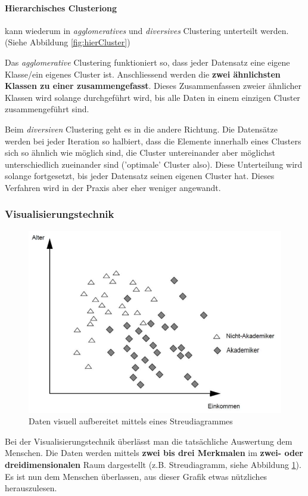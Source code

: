 \documentclass[a4paper, 11pt, nofootinbib]{article}
\begin{document}
 \paragraph{Hierarchisches Clusteriong} kann wiederum in \textit{agglomeratives} und \textit{diversives} Clustering unterteilt werden. (Siehe Abbildung \ref{fig:hierCluster})
 
 Das \textit{agglomerative} Clustering funktioniert so, dass jeder Datensatz eine eigene Klasse/ein eigenes Cluster ist. Anschliessend werden die \textbf{zwei ähnlichsten Klassen zu einer zusammengefasst}. Dieses Zusammenfassen zweier ähnlicher Klassen wird solange durchgeführt wird, bis alle Daten in einem einzigen Cluster zusammengeführt sind.
 
 \vspace{10px}
 
 \noindent Beim \textit{diversiven} Clustering geht es in die andere Richtung. Die Datensätze werden bei jeder Iteration so halbiert, dass die Elemente innerhalb eines Clusters sich so ähnlich wie möglich sind, die Cluster untereinander aber möglichst unterschiedlich zueinander sind ('optimale' Cluster also). Diese Unterteilung wird solange fortgesetzt, bis jeder Datensatz seinen eigenen Cluster hat. Dieses Verfahren wird in der Praxis aber eher weniger angewandt.
 
 \subsubsection{Visualisierungstechnik}
 \begin{figure}
 	\centering
 	\includegraphics[keepaspectratio=true,height=13\baselineskip]{streudiagramm.PNG}
 	\caption{Daten visuell aufbereitet mittels eines Streudiagrammes}
 	\label{fig:streu}
 \end{figure}
 Bei der Visualisierungstechnik überlässt man die tatsächliche Auswertung dem Menschen. Die Daten werden mittels \textbf{zwei bis drei Merkmalen} im \textbf{zwei- oder dreidimensionalen} Raum dargestellt (z.B. Streudiagramm, siehe Abbildung \ref{fig:streu}). Es ist nun dem Menschen überlassen, aus dieser Grafik etwas nützliches herauszulesen.
 
\end{document}
